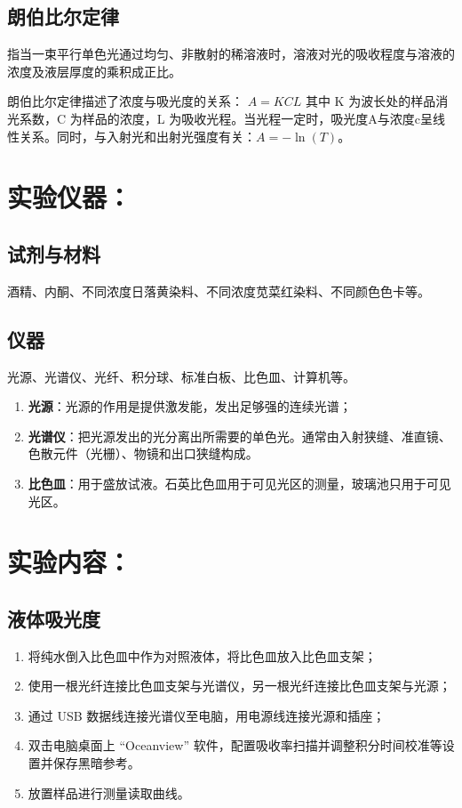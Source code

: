 \subsection{朗伯比尔定律}
指当一束平行单色光通过均匀、非散射的稀溶液时，溶液对光的吸收程度与溶液的浓度及液层厚度的乘积成正比。

朗伯比尔定律描述了浓度与吸光度的关系：
$A = K C L$
其中 K 为波长处的样品消光系数，C 为样品的浓度，L 为吸收光程。当光程一定时，吸光度A与浓度c呈线性关系。同时，与入射光和出射光强度有关：$A = -\ln(T)$。

\section{实验仪器：}
\subsection{试剂与材料}
酒精、内酮、不同浓度日落黄染料、不同浓度苋菜红染料、不同颜色色卡等。

\subsection{仪器}
光源、光谱仪、光纤、积分球、标准白板、比色皿、计算机等。
\begin{enumerate}[label=\arabic* 、, leftmargin=4em, labelsep=0pt]
    \item \textbf{光源}：光源的作用是提供激发能，发出足够强的连续光谱；
    \item \textbf{光谱仪}：把光源发出的光分离出所需要的单色光。通常由入射狭缝、准直镜、色散元件（光栅）、物镜和出口狭缝构成。
    \item \textbf{比色皿}：用于盛放试液。石英比色皿用于可见光区的测量，玻璃池只用于可见光区。
\end{enumerate}

\section{实验内容：}
\subsection{液体吸光度}
\begin{enumerate}[label=\arabic* 、, leftmargin=4em, labelsep=0pt]
    \item 将纯水倒入比色皿中作为对照液体，将比色皿放入比色皿支架；
    \item 使用一根光纤连接比色皿支架与光谱仪，另一根光纤连接比色皿支架与光源；
    \item 通过 USB 数据线连接光谱仪至电脑，用电源线连接光源和插座；
    \item 双击电脑桌面上 “Oceanview” 软件，配置吸收率扫描并调整积分时间校准等设置并保存黑暗参考。
    \item 放置样品进行测量读取曲线。
\end{enumerate}

